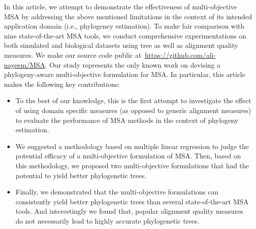 In this article, we attempt to demonstrate the effectiveness of multi-objective MSA by addressing the above mentioned limitations in the context of its intended application domain (i.e., phylogeney estimation).
To make fair comparison with nine state-of-the-art MSA tools, we conduct comprehensive experimentations on both simulated and biological datasets using tree as well as alignment quality measures. 
We make our source code public at~\url{https://github.com/ali-nayeem/MSA}. Our study represents the only known work on devising a phylogeny-aware multi-objective formulation for MSA. In particular, this article makes the following key contributions:
\begin{itemize}
	\item To the best of our knowledge, this is the first attempt to investigate the effect of using domain specific measures (as opposed to generic alignment measures) to evaluate the performance of MSA methods in the context of phylogeny estimation.
	
	\item We suggested a methodology based on multiple linear regression to judge the potential efficacy of a multi-objective formulation of MSA. Then, based on this methodology, we proposed two multi-objective formulations that had the potential to yield better phylogenetic trees.
	
	\item Finally, we demonstrated that the multi-objective formulations can consistently yield better phylogenetic trees than several state-of-the-art MSA tools. And interestingly we found that, popular alignment quality measures do not necessarily lead to highly accurate phylogenetic trees. 
	
\end{itemize}
 
